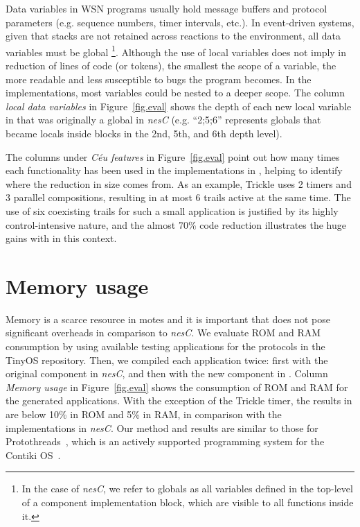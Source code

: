 Data variables in WSN programs usually hold message buffers and protocol 
parameters (e.g. sequence numbers, timer intervals, etc.).
In event-driven systems, given that stacks are not retained across reactions to 
the environment, all data variables must be global%
\footnote{In the case of \emph{nesC}, we refer to globals as all variables 
defined in the top-level of a component implementation block, which are visible 
to all functions inside it.}.
Although the use of local variables does not imply in reduction of lines of 
code (or tokens), the smallest the scope of a variable, the more readable and 
less susceptible to bugs the program becomes.
%
In the \CEU implementations, most variables could be nested to a deeper scope.
The column \emph{local data variables} in Figure~\ref{fig.eval} shows the depth 
of each new local variable in \CEU that was originally a global in \emph{nesC} 
(e.g. ``2;5;6'' represents globals that became locals inside blocks in the 2nd, 
5th, and 6th depth level).

The columns under \emph{C\'eu features} in Figure~\ref{fig.eval} point out how 
many times each functionality has been used in the implementations in \CEU, 
helping to identify where the reduction in size comes from.
%
As an example, Trickle uses 2 timers and 3 parallel compositions, resulting in 
at most 6 trails active at the same time.
The use of six coexisting trails for such a small application is justified by 
its highly control-intensive nature, and the almost 70\% code reduction 
illustrates the huge gains with \CEU in this context.
%


\section{Memory usage}
\label{sec.eval.resource}

Memory is a scarce resource in motes and it is important that \CEU does not 
pose significant overheads in comparison to \emph{nesC}.
%
We evaluate ROM and RAM consumption by using available testing applications for 
the protocols in the TinyOS repository.
Then, we compiled each application twice: first with the original component in 
\emph{nesC}, and then with the new component in \CEU.
%
Column \emph{Memory usage} in Figure~\ref{fig.eval} shows the consumption of 
ROM and RAM for the generated applications.
With the exception of the Trickle timer, the results in \CEU are below 10\% in 
ROM and 5\% in RAM, in comparison with the implementations in \emph{nesC}.
%
Our method and results are similar to those for
Protothreads~\cite{wsn.protothreads}, which is an actively supported 
programming system for the Contiki OS~\cite{wsn.contiki}.

